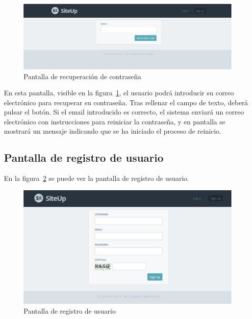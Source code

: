 \begin{figure}[htbp]
  \centering
  \includegraphics[width=\textwidth]{5_diseno/web-forgot-password}
  \caption{Pantalla de recuperación de contraseña}
  \label{fig:web-forgot-password}
\end{figure}

En esta pantalla, visible en la figura~\ref{fig:web-forgot-password}, el usuario
podrá introducir su correo electrónico para recuperar su contraseña. Tras
rellenar el campo de texto, deberá pulsar el botón. Si el email introducido es
correcto, el sistema enviará un correo electrónico con instrucciones para
reiniciar la contraseña, y en pantalla se mostrará un mensaje indicando que se
ha iniciado el proceso de reinicio.


\subsection{Pantalla de registro de usuario}

En la figura~\ref{fig:web-register} se puede ver la pantalla de registro de
usuario.

\begin{figure}[htbp]
  \centering
  \includegraphics[width=\textwidth]{5_diseno/web-register}
  \caption{Pantalla de registro de usuario}
  \label{fig:web-register}
\end{figure}

